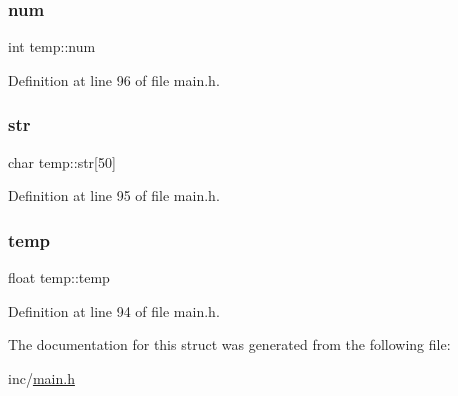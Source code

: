 \subsubsection{\texorpdfstring{num}{num}}
{\footnotesize\ttfamily int temp\+::num}



Definition at line 96 of file main.\+h.

\mbox{\label{structtemp_af9b2099e55b58c3aabcde6e7dd077dae}} 
\subsubsection{\texorpdfstring{str}{str}}
{\footnotesize\ttfamily char temp\+::str\mbox{[}50\mbox{]}}



Definition at line 95 of file main.\+h.

\mbox{\label{structtemp_ab73df077c620529b5de4a6bdaf187113}} 
\subsubsection{\texorpdfstring{temp}{temp}}
{\footnotesize\ttfamily float temp\+::temp}



Definition at line 94 of file main.\+h.



The documentation for this struct was generated from the following file\+:\begin{DoxyCompactItemize}
\item 
inc/\hyperlink{main_8h}{main.\+h}\end{DoxyCompactItemize}

